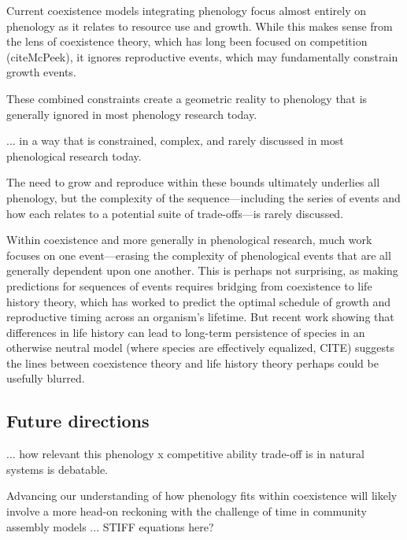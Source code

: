Current coexistence models integrating phenology focus almost entirely on phenology as it relates to resource use and growth. While this makes sense from the lens of coexistence theory, which has long been focused on competition (citeMcPeek), it ignores reproductive events, which may fundamentally constrain growth events. 

These combined constraints create a geometric reality to phenology that is generally ignored in most phenology research today. 

... in a way that is constrained, complex, and rarely discussed in most phenological research today.  

The need to grow and reproduce within these bounds ultimately underlies all phenology, but the complexity of the sequence---including the series of events and how each relates to a potential suite of trade-offs---is rarely discussed. 

Within coexistence and more generally in phenological research, much work focuses on one event---erasing the complexity of phenological events that are all generally dependent upon one another. This is perhaps not surprising, as making predictions for sequences of events requires bridging from coexistence to life history theory, which has worked to predict the optimal schedule of growth and reproductive timing across an organism's lifetime. But recent work showing that differences in life history can lead to long-term persistence of species in an otherwise neutral model (where species are effectively equalized, CITE) suggests the lines between coexistence theory and life history theory perhaps could be usefully blurred. 


\subsection*{Future directions}

... how relevant this phenology x competitive ability  trade-off is in natural systems is debatable. 
 
 Advancing our understanding of how phenology fits within coexistence will likely involve a more head-on reckoning with the challenge of time in community assembly models ... STIFF equations here? 


